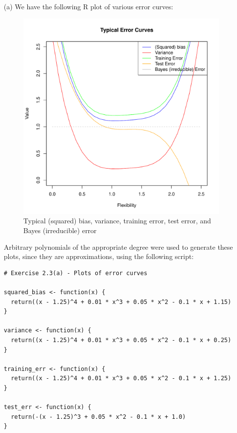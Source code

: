
\begin{itemize}
    \item[(a)] We have the following R plot of various error curves:
    \begin{figure}[!ht]
        \includegraphics[scale=0.6, center]{./plots/ex2_3_a.pdf}
        \caption{
            Typical (squared) bias, variance, training error, test error, and Bayes 
            (irreducible) error
        }\label{fig:figure1}
    \end{figure}
    Arbitrary polynomials of the appropriate degree were used to generate these 
    plots, since they are approximations, using the following script:
    \begin{verbatim}
# Exercise 2.3(a) - Plots of error curves

squared_bias <- function(x) {
  return((x - 1.25)^4 + 0.01 * x^3 + 0.05 * x^2 - 0.1 * x + 1.15)
}

variance <- function(x) {
  return((x - 1.25)^4 + 0.01 * x^3 + 0.05 * x^2 - 0.1 * x + 0.25)
}

training_err <- function(x) {
  return((x - 1.25)^4 + 0.01 * x^3 + 0.05 * x^2 - 0.1 * x + 1.25)
}

test_err <- function(x) {
  return(-(x - 1.25)^3 + 0.05 * x^2 - 0.1 * x + 1.0)
}


\end{verbatim}
\end{itemize}
